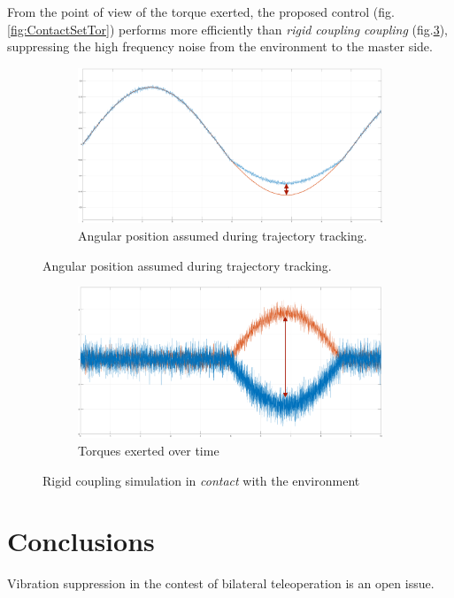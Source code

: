 From the point of view of the torque exerted, the proposed control
(fig.\ref{fig:ContactSetTor}) performs more efficiently than \textsl{rigid coupling coupling} (fig.\ref{fig:ContactRigTor}), suppressing the high frequency noise from the environment to the master side.

  
\begin{figure}[H]
	\begin{subfigure}{1\linewidth}
		\centering
		\includegraphics[width=\textwidth, height=0.45\textwidth]{Images/rigidContactReacPosArrow}
		\caption{ Angular position assumed during trajectory tracking.}
		\label{fig:ContactRigPos}
	\end{subfigure}	
\end{figure}
\begin{figure}[H]\ContinuedFloat
	\begin{subfigure}{1\linewidth}
		\centering
		\includegraphics[width=\textwidth, height=0.45\textwidth]{Images/rigidContactReacTorArrow}
		\caption{ Torques exerted over time}
		\label{fig:ContactRigTor}
	\end{subfigure}	
  \caption{ Rigid coupling simulation in \textsl{contact} with the environment}
  \label{fig:contact_rigid}
\end{figure}

\newpage
\section{Conclusions}
Vibration suppression in the contest of bilateral teleoperation is an open
issue.

